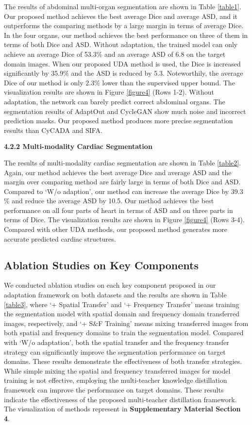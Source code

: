 \documentclass[letterpaper]{article} %
\begin{document}
\noindent The results of abdominal multi-organ segmentation are shown in Table \ref{table1}. Our proposed method achieves the best
average Dice and average ASD, and it outperforms the comparing methods by a large margin in terms of average Dice.
In the four organs, our method achieves the best performance on three of them in terms of both Dice
and ASD. Without adaptation, the trained model can only achieve an average Dice of 53.3$\%$ and an average ASD
of 6.8 on the target domain images. When our proposed UDA method is used, the Dice is increased significantly
by 35.9$\%$ and the ASD is reduced by 5.3. Noteworthily, the average Dice of our method is only 2.3$\%$
lower than the supervised upper bound. The visualization results  are shown in Figure \ref{figure4} (Rows 1-2).
Without adaptation, the network can barely predict correct abdominal organs. The segmentation
results of AdaptOut and CycleGAN show much noise and incorrect prediction masks. Our proposed method produces more
precise segmentation results than CyCADA and SIFA.


\noindent  \textbf{4.2.2 Multi-modality Cardiac Segmentation}

\noindent The results of multi-modality cardiac segmentation are shown in Table \ref{table2}. Again, our method achieves the
best average Dice and average ASD and the margin over comparing method are fairly large in terms of both Dice
and ASD. Compared to `W/o adaption', our method can increase the average Dice by 39.3$\%$ and reduce the average
ASD by 10.5. Our method achieves the best performance on all four parts of heart in terms of ASD and on
three parts in terms of Dice. The visualization results are shown in Figure \ref{figure4} (Rows 3-4). Compared
with other UDA methods, our proposed method generates more accurate predicted cardiac structures.



\subsection{Ablation Studies on Key Components}



We conducted ablation studies on each key component proposed in our adaptation framework on both datasets and the results
are shown in Table \ref{table3}, where `+ Spatial Transfer' and `+ Frequency Transfer'
means training the segmentation model with spatial domain and frequency domain transferred images, respectively,
and `+ S$\&$F Training' means mixing transferred images from both spatial and frequency domains to train the segmentation model.
Compared with `W/o adaptation', both the spatial transfer and the frequency transfer
strategy can significantly improve the segmentation performance on target domains. These results demonstrate the
effectiveness of both transfer strategies. While simple mixing the spatial and frequency transferred images
for model training is not effective, employing the multi-teacher knowledge distillation framework
can improve the performance on target domains. These results indicate the effectiveness of the
proposed multi-teacher distillation framework. The visualization of methods represent in \textbf{Supplementary Material Section 4}.
\end{document}
